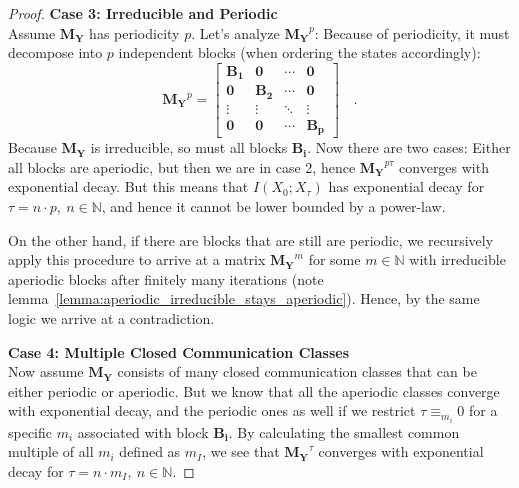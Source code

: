 \documentclass[../../main.tex]{subfiles}
\begin{document}
\begin{proof}
        \textbf{Case 3: Irreducible and Periodic} \\
        Assume $\bm{M_Y}$ has periodicity $p$. Let's analyze $\bm{M_Y}^p$: Because of periodicity, it must decompose into $p$ independent blocks (when ordering the states accordingly):
        \[
            \bm{M_Y}^p = 
            \begin{bmatrix}
            \bm{B_1} & \bm{0} & \cdots & \bm{0} \\
            \bm{0} & \bm{B_2} & \cdots & \bm{0} \\
            \vdots & \vdots & \ddots & \vdots \\
            \bm{0} & \bm{0} & \cdots & \bm{B_p}
            \end{bmatrix}
            \quad .
        \]
        Because $\bm{M_Y}$ is irreducible, so must all blocks $\bm{B_i}$. Now there are two cases: Either all blocks are aperiodic, but then we are in case 2, hence $\bm{M_Y}^{p \tau}$ converges with exponential decay. But this means that $I(X_0; X_\tau)$ has exponential decay for $\tau = n \cdot p, \ n \in \mathbb{N}$, and hence it cannot be lower bounded by a power-law.

        On the other hand, if there are blocks that are still are periodic, we recursively apply this procedure to arrive at a matrix $\bm{M_Y}^m$ for some $m \in \mathbb{N}$ with irreducible aperiodic blocks after finitely many iterations (note
        lemma~\ref{lemma:aperiodic_irreducible_stays_aperiodic}). Hence, by the same logic we arrive at a contradiction.

        \textbf{Case 4: Multiple Closed Communication Classes} \\
        Now assume $\bm{M_Y}$ consists of many closed communication classes that can be either periodic or aperiodic. But we know that all the aperiodic classes converge with exponential decay, and the periodic ones as well if we restrict $\tau \equiv_{m_i} 0$ for a specific $m_i$ associated with block $\bm{B_i}$. By calculating the smallest common multiple of all $m_i$ defined as $m_I$, we see that $\bm{M_Y}^\tau$ converges with exponential decay for $\tau = n \cdot m_I, \ n \in \mathbb{N}$.


\end{proof}
\end{document}
